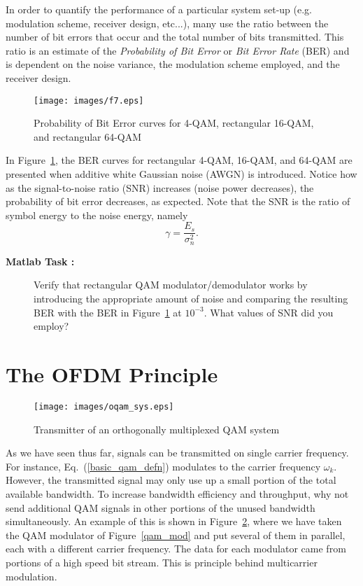 \documentclass[12pt]{article}
\newcounter{matlabcnt}
\begin{document}
In order to quantify the performance of a particular system set-up
(e.g. modulation scheme, receiver design, etc...), many use the
ratio between the number of bit errors that occur and the total
number of bits transmitted. This ratio is an estimate of the {\it
Probability of Bit Error} or {\it Bit Error Rate} (BER) and is
dependent on the noise variance, the modulation scheme employed,
and the receiver design.
\begin{figure}[t]
  \centering
  \texttt{[image: images/f7.eps]}\\
  \caption{Probability of Bit Error curves for 4-QAM, rectangular 16-QAM, and rectangular 64-QAM}\label{ber_curves}
\end{figure}

In Figure~\ref{ber_curves}, the BER curves for rectangular 4-QAM,
16-QAM, and 64-QAM are presented when additive white Gaussian
noise (AWGN) is introduced. Notice how as the signal-to-noise
ratio (SNR) increases (noise power decreases), the probability of
bit error decreases, as expected. Note that the SNR is the ratio
of symbol energy to the noise energy, namely
\begin{equation}
\gamma=\frac{E_s}{\sigma_n^2}.
\end{equation}

\begin{description}
    \item[{\bf Matlab Task :}]
    Verify that rectangular QAM modulator/demodulator works by
    introducing the appropriate amount of noise and comparing the
    resulting BER with the BER in Figure~\ref{ber_curves} at
    $10^{-3}$. What values of SNR did you employ?
\end{description}



\section{The OFDM Principle}
\begin{figure}[ht] \centering
\texttt{[image: images/oqam\_sys.eps]}\\
\caption{Transmitter of an orthogonally multiplexed QAM
system}\label{oqamsys}
\end{figure}

As we have seen thus far, signals can be transmitted on single
carrier frequency. For instance, Eq.~(\ref{basic_qam_defn})
modulates to the carrier frequency $\omega_k$. However, the
transmitted signal may only use up a small portion of the total
available bandwidth. To increase bandwidth efficiency and
throughput, why not send additional QAM signals in other portions
of the unused bandwidth simultaneously. An example of this is
shown in Figure~\ref{oqamsys}, where we have taken the QAM
modulator of Figure~\ref{qam_mod} and put several of them in
parallel, each with a different carrier frequency. The data for
each modulator came from portions of a high speed bit stream. This
is principle behind multicarrier modulation.
\end{document}
